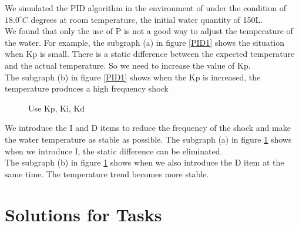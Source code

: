 \documentclass{mcmthesis}
\begin{document}
\indent We simulated the PID algorithm in the environment of under the condition of $18.0^{\circ}C$ degrees at room temperature, the initial water quantity of 150L.\\
\indent We found that only the use of P is not a good way to adjust the temperature of the water. For example, the subgraph (a) in figure \ref{PID1} shows the situation when Kp is small. There is a static difference between the expected temperature and the actual temperature. So we need to increase the value of Kp.\\
\indent The subgraph (b) in figure \ref{PID1} shows when the Kp is increased, the temperature produces a high frequency shock\\

\begin{figure}[H]
\centering
{}
\caption{Use Kp, Ki, Kd}
\label{PID2}
\end{figure}
\indent We introduce the I and D items to reduce the frequency of the shock and make the water temperature as stable as possible. The subgraph (a) in figure \ref{PID2} shows when we introduce I, the static difference can be eliminated. \\
\indent The subgraph (b) in figure \ref{PID2} shows when we also introduce the D item at the same time. The temperature trend becomes more stable.\\
\section{Solutions for Tasks}
\end{document}
